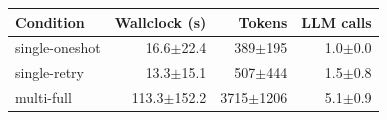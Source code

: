 \begin{tabular}{@{}lrrr@{}}
\toprule
Condition & Wallclock (s) & Tokens & LLM calls \\
\midrule
single-oneshot & 16.6$\pm$22.4 & 389$\pm$195 & 1.0$\pm$0.0 \\
single-retry & 13.3$\pm$15.1 & 507$\pm$444 & 1.5$\pm$0.8 \\
multi-full & 113.3$\pm$152.2 & 3715$\pm$1206 & 5.1$\pm$0.9 \\
\bottomrule
\end{tabular}
